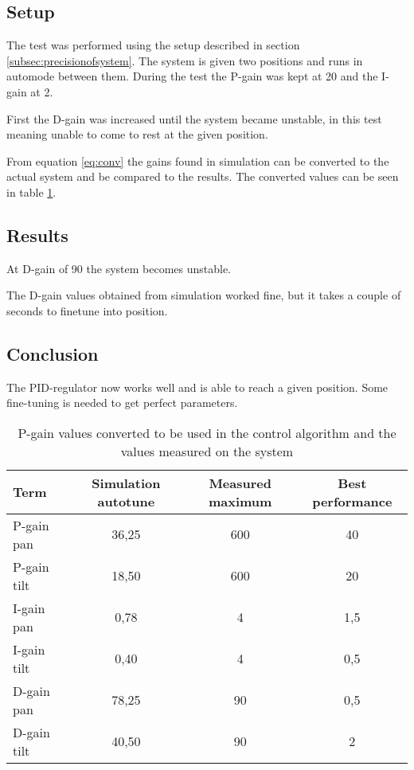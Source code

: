 \subsection*{Setup}
The test was performed using the setup described in
section \ref{subsec:precisionofsystem}. The system is given two positions and runs in automode between them. During the test
the P-gain was kept at 20 and the I-gain at 2.

First the D-gain was increased until the system became unstable, in this test
meaning unable to come to rest at the given position.

From equation \ref{eq:conv} the gains found in simulation can be converted to the actual
system and be compared to the results. The converted values can be seen in
table \ref{tab:actual_gain_values}. 

\subsection*{Results}
At D-gain of 90 the system becomes unstable.

The D-gain values obtained from simulation worked fine, but it takes a couple of
seconds to finetune into position.

\subsection*{Conclusion}
The PID-regulator now works well and is able to reach a given position. Some
fine-tuning is needed to get perfect parameters.

\begin{table}[htb]
	\begin{center}
	\begin{tabular}{l|c|c|c}			
	Term & Simulation autotune & Measured maximum & Best performance  \\	\hline								
	P-gain pan & 36,25 & 600 & 40 \\
	P-gain tilt   & 18,50 & 600 & 20 \\
	I-gain pan  & 0,78 & 4 & 1,5 \\
	I-gain tilt   & 0,40  & 4 & 0,5 \\
	D-gain pan & 78,25 & 90 & 0,5 \\
	D-gain tilt   & 40,50 & 90 & 2 \\
	\end{tabular}
	\end{center}
	\caption{P-gain values converted to be used in the control algorithm and the values measured on the system}				
	\label{tab:actual_gain_values}			
\end{table}

